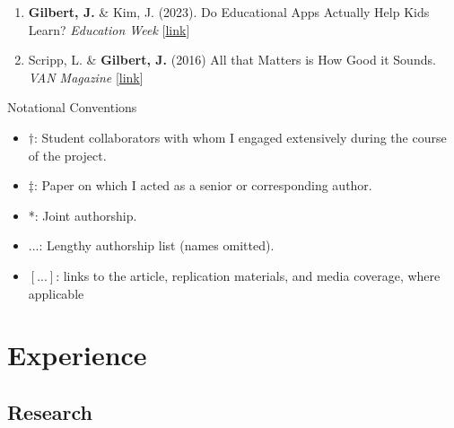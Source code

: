\documentclass[11pt]{article}
\begin{document}
\begin{enumerate}

\subsection{Popular Press}

    \item \textbf{Gilbert, J.} \& Kim, J. (2023). Do Educational Apps Actually Help Kids Learn?  \textit{Education Week} [\href{https://www.edweek.org/technology/opinion-do-educational-apps-actually-help-kids-learn/2023/10}{link}]
    \item Scripp, L. \& \textbf{Gilbert, J.} (2016) All that Matters is How Good it Sounds. \textit{VAN Magazine} [\href{https://van-magazine.com/mag/all-that-matters/}{link}]

    \end{enumerate}

Notational Conventions \\

 \begin{itemize}
\item[]$\dagger$: Student collaborators with whom I engaged extensively during the course of the project.
\item[]$\ddagger$: Paper on which I acted as a senior or corresponding author.
\item[]*: Joint authorship.
\item[]...: Lengthy authorship list (names omitted).
\item []$[...]$: links to the article, replication materials, and media coverage, where applicable
 \end{itemize}


\section{Experience}

\subsection{Research}
\end{document}
